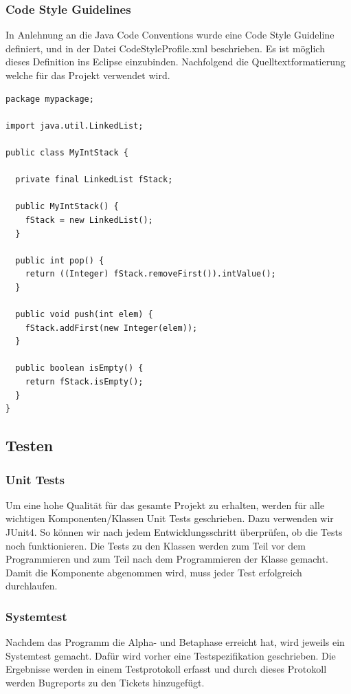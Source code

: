 \documentclass[a4,12pt]{scrartcl}
\begin{document}
\subsubsection{Code Style Guidelines}
In Anlehnung an die Java Code Conventions wurde eine Code Style Guideline definiert, und in der Datei CodeStyleProfile.xml beschrieben. Es ist möglich dieses Definition ins Eclipse einzubinden. Nachfolgend die Quelltextformatierung welche für das Projekt verwendet wird. 
\begin{lstlisting}
package mypackage;

import java.util.LinkedList;

public class MyIntStack {

  private final LinkedList fStack;

  public MyIntStack() {
    fStack = new LinkedList();
  }

  public int pop() {
    return ((Integer) fStack.removeFirst()).intValue();
  }

  public void push(int elem) {
    fStack.addFirst(new Integer(elem));
  }

  public boolean isEmpty() {
    return fStack.isEmpty();
  }
}
\end{lstlisting}

\subsection{Testen}
\subsubsection{Unit Tests}
Um eine hohe Qualität für das gesamte Projekt zu erhalten, werden für alle wichtigen Komponenten/Klassen Unit Tests geschrieben.
Dazu verwenden wir JUnit4.
So können wir nach jedem Entwicklungsschritt überprüfen, ob die Tests noch funktionieren.
Die Tests zu den Klassen werden zum Teil vor dem Programmieren und zum Teil nach dem Programmieren der Klasse gemacht.
Damit die Komponente abgenommen wird, muss jeder Test erfolgreich durchlaufen.

\subsubsection{Systemtest}
Nachdem das Programm die Alpha- und Betaphase erreicht hat, wird jeweils ein Systemtest gemacht.
Dafür wird vorher eine Testspezifikation geschrieben.
Die Ergebnisse werden in einem Testprotokoll erfasst und durch dieses Protokoll werden Bugreports zu den Tickets hinzugefügt.
\end{document}
